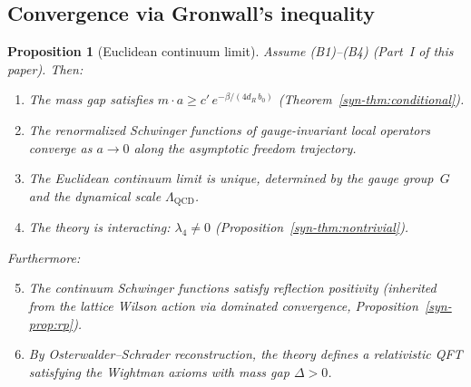 \documentclass[11pt]{article}
\newtheorem{proposition}[theorem]{Proposition}
\theoremstyle{definition}
\begin{document}
\subsection{Convergence via Gronwall's inequality}

\begin{proposition}[Euclidean continuum limit]
\label{syn-thm:unique}
Assume (B1)--(B4) (Part~I of this paper).
Then:
\begin{enumerate}[label=\textup{(\alph*)},nosep]
  \item The mass gap satisfies
    $m \cdot a \geq c'\,e^{-\beta/(4d_R\,b_0)}$
    \textup{(}Theorem~\ref{syn-thm:conditional}\textup{)}.
  \item The renormalized Schwinger functions of
    gauge-invariant local operators converge as
    $a \to 0$ along the asymptotic freedom trajectory.
  \item The Euclidean continuum limit is unique, determined
    by the gauge group~$G$ and the dynamical scale
    $\Lambda_{\mathrm{QCD}}$.
  \item The theory is interacting: $\lambda_4 \neq 0$
    \textup{(}Proposition~\ref{syn-thm:nontrivial}\textup{)}.
\end{enumerate}
Furthermore:
\begin{enumerate}[label=\textup{(\alph*)},nosep]
  \setcounter{enumi}{4}
  \item The continuum Schwinger functions satisfy reflection
    positivity \textup{(}inherited from the lattice Wilson
    action via dominated convergence,
    Proposition~\ref{syn-prop:rp}\textup{)}.
  \item By Osterwalder--Schrader
    reconstruction, the theory defines a relativistic
    QFT satisfying the Wightman axioms with mass gap
    $\Delta > 0$.
\end{enumerate}
\end{proposition}
\end{document}
